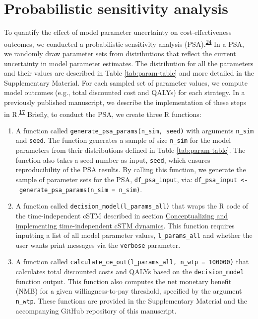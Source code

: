 \documentclass[
]{article}
\providecommand{\tightlist}{%
  \setlength{\itemsep}{0pt}\setlength{\parskip}{0pt}}
\begin{document}
\hypertarget{probabilistic-sensitivity-analysis}{%
\section{Probabilistic sensitivity analysis}\label{probabilistic-sensitivity-analysis}}

To quantify the effect of model parameter uncertainty on cost-effectiveness outcomes, we conducted a probabilistic sensitivity analysis (PSA).\textsuperscript{\protect\hyperlink{ref-Briggs2012}{24}} In a PSA, we randomly draw parameter sets from distributions that reflect the current uncertainty in model parameter estimates. The distribution for all the parameters and their values are described in Table \ref{tab:param-table} and more detailed in the Supplementary Material. For each sampled set of parameter values, we compute model outcomes (e.g., total discounted cost and QALYs) for each strategy. In a previously published manuscript, we describe the implementation of these steps in R.\textsuperscript{\protect\hyperlink{ref-Alarid-Escudero2019e}{17}} Briefly, to conduct the PSA, we create three R functions:

\begin{enumerate}
\def\labelenumi{\arabic{enumi}.}
\tightlist
\item
  A function called \texttt{generate\_psa\_params(n\_sim,\ seed)} with arguments \texttt{n\_sim} and \texttt{seed}. The function generates a sample of size \texttt{n\_sim} for the model parameters from their distributions defined in Table \ref{tab:param-table}. The function also takes a seed number as input, \texttt{seed}, which ensures reproducibility of the PSA results. By calling this function, we generate the sample of parameter sets for the PSA, \texttt{df\_psa\_input}, via: \texttt{df\_psa\_input\ \textless{}-\ generate\_psa\_params(n\_sim\ =\ n\_sim)}.
\item
  A function called \texttt{decision\_model(l\_params\_all)} that wraps the R code of the time-independent cSTM described in section \protect\hyperlink{conceptualizing-and-implementing-time-independent-cSTM-dynamics}{Conceptualizing and implementing time-independent cSTM dynamics}. This function requires inputting a list of all model parameter values, \texttt{l\_params\_all} and whether the user wants print messages via the \texttt{verbose} parameter.
\item
  A function called \texttt{calculate\_ce\_out(l\_params\_all,\ n\_wtp\ =\ 100000)} that calculates total discounted costs and QALYs based on the \texttt{decision\_model} function output. This function also computes the net monetary benefit (NMB) for a given willingness-to-pay threshold, specified by the argument \texttt{n\_wtp}.
  These functions are provided in the Supplementary Material and the accompanying GitHub repository of this manuscript.
\end{enumerate}
\end{document}
